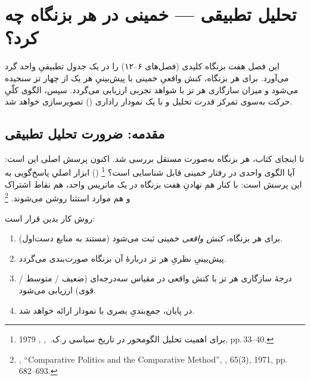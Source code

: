 
\chapter{تحلیل تطبیقی — خمینی در هر بزنگاه چه کرد؟}
\label{ch:comparative}

\begin{infoBox}
این فصل هفت بزنگاه کلیدی (فصل‌های ۶–۱۲) را در یک جدول تطبیقیِ واحد گرد می‌آورد.
برای هر بزنگاه، کنش واقعیِ خمینی با پیش‌بینیِ هر یک از چهار تز سنجیده می‌شود
و میزان سازگاری هر تز با شواهد تجربی ارزیابی می‌گردد.
سپس، الگوی کلّیِ حرکت به‌سوی تمرکز قدرت تحلیل و با یک نمودار راداری
() تصویر‌سازی خواهد شد.
\end{infoBox}

\section{مقدمه: ضرورت تحلیل تطبیقی}
\label{sec:ch13-intro}

تا اینجای کتاب، هر بزنگاه به‌صورت مستقل بررسی شد.
اکنون پرسش اصلی این است:
آیا الگوی واحدی در رفتار خمینی قابل شناسایی است؟%
\footnote{برای اهمیت تحلیل الگومحور در تاریخ سیاسی
ر.ک.\ ,
\textit{}, 1979, pp.\,33–40.}
 ()
ابزار اصلیِ پاسخ‌گویی به این پرسش است:
با کنار هم نهادنِ هفت بزنگاه در یک ماتریس واحد،
هم نقاط اشتراک و هم موارد استثنا روشن می‌شوند.%
\footnote{%
,
``Comparative Politics and the Comparative Method'',
\textit{}, 65(3), 1971, pp.\,682–693.}

روش کار بدین قرار است:
\begin{enumerate}
\item برای هر بزنگاه، \emph{کنش واقعی} خمینی ثبت می‌شود
      (مستند به منابع دست‌اول).
\item پیش‌بینیِ نظریِ هر تز دربارهٔ آن بزنگاه صورت‌بندی می‌گردد.
\item درجهٔ سازگاری هر تز با کنش واقعی در مقیاس سه‌درجه‌ای
      (ضعیف / متوسط / قوی) ارزیابی می‌شود.
\item در پایان، جمع‌بندیِ بصری با نمودار ارائه خواهد شد.
\end{enumerate}

